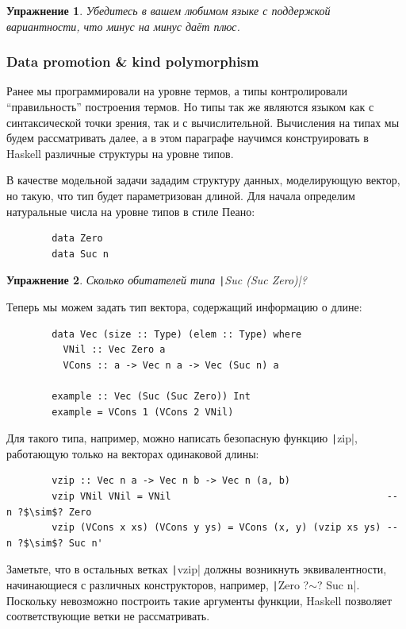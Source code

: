 \documentclass[12pt]{article}
\newtheorem{task}{Упражнение}
\begin{document}
    \begin{task}
        Убедитесь в вашем любимом языке с поддержкой вариантности, что минус на минус даёт плюс.
    \end{task}

    \subsubsection{Data promotion \& kind polymorphism} \label{subsubsec:promotion}

    Ранее мы программировали на уровне термов, а типы контролировали ``правильность'' построения термов.
    Но типы так же являются языком как с синтаксической точки зрения, так и с вычислительной.
    Вычисления на типах мы будем рассматривать далее, а в этом параграфе научимся конструировать в Haskell различные структуры на уровне типов.

    В качестве модельной задачи зададим структуру данных, моделирующую вектор, но такую, что тип будет параметризован длиной.
    Для начала определим натуральные числа на уровне типов в стиле Пеано:
    \begin{verbatim}
        data Zero
        data Suc n
    \end{verbatim}

    \begin{task}
        Сколько обитателей типа \texttt|Suc (Suc Zero)|?
    \end{task}

    Теперь мы можем задать тип вектора, содержащий информацию о длине:
    \begin{verbatim}
        data Vec (size :: Type) (elem :: Type) where
          VNil :: Vec Zero a
          VCons :: a -> Vec n a -> Vec (Suc n) a

        example :: Vec (Suc (Suc Zero)) Int
        example = VCons 1 (VCons 2 VNil)
    \end{verbatim}

    Для такого типа, например, можно написать безопасную функцию \texttt|zip|, работающую только на векторах одинаковой длины:
    \begin{verbatim}
        vzip :: Vec n a -> Vec n b -> Vec n (a, b)
        vzip VNil VNil = VNil                                      -- n ?$\sim$? Zero
        vzip (VCons x xs) (VCons y ys) = VCons (x, y) (vzip xs ys) -- n ?$\sim$? Suc n'
    \end{verbatim}

    Заметьте, что в остальных ветках \texttt|vzip| должны возникнуть эквивалентности, начинающиеся с различных конструкторов, например, \texttt|Zero ?$\sim$? Suc n|.
    Поскольку невозможно построить такие аргументы функции, Haskell позволяет соответствующие ветки не рассматривать.
\end{document}
